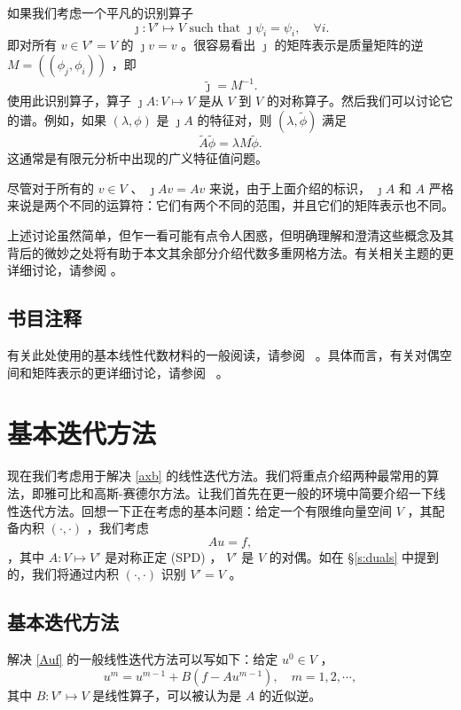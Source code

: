 \documentclass[12pt]{acta_2011xz}
\begin{document}
如果我们考虑一个平凡的识别算子 
   $$
\jmath:  V'\mapsto V \mbox{ such that } \jmath
\psi_i=\psi_i,\quad\forall i.
$$    即对所有    $v\in V'=V$    的    $\jmath v=v$    。很容易看出    $\jmath$    的矩阵表示是质量矩阵的逆
   $M=((\phi_j,\phi_i))$    ，即
   $$
\tilde \jmath=M^{-1}.
$$    使用此识别算子，算子    $\jmath A: V\mapsto
V$    是从    $V$    到    $V$    的对称算子。然后我们可以讨论它的谱。例如，如果    $(\lambda, \phi)$    是    $\jmath A$    的特征对，则    $(\lambda, \tilde\phi)$    满足
   $$
\tilde A\tilde \phi=\lambda M\tilde \phi.
$$    这通常是有限元分析中出现的广义特征值问题。  

尽管对于所有的    $v\in V$    、    $\jmath Av=Av$    来说，由于上面介绍的标识，    $\jmath A$    和    $A$    严格来说是两个不同的运算符：它们有两个不同的范围，并且它们的矩阵表示也不同。  

上述讨论虽然简单，但乍一看可能有点令人困惑，但明确理解和澄清这些概念及其背后的微妙之处将有助于本文其余部分介绍代数多重网格方法。有关相关主题的更详细讨论，请参阅    \cite{XuMSC-Notes}    。  

   \subsection{书目注释  }    有关此处使用的基本线性代数材料的一般阅读，请参阅~    \cite{1974HalmosP-aa,1992XuJ-aa,XuMSC-Notes}    。具体而言，有关对偶空间和矩阵表示的更详细讨论，请参阅~    \cite{1992XuJ-aa,XuMSC-Notes}    。  

   \section{基本迭代方法  }    
   \label{sec:iterate}    现在我们考虑用于解决    \eqref{axb}    的线性迭代方法。我们将重点介绍两种最常用的算法，即雅可比和高斯-赛德尔方法。让我们首先在更一般的环境中简要介绍一下线性迭代方法。回想一下正在考虑的基本问题：给定一个有限维向量空间    $V$    ，其配备内积
   $(\cdot,\cdot)$    ，我们考虑
   \begin{equation}
\label{Auf}
Au=f,   
\end{equation}    ，其中    $ A: V\mapsto V' $    是对称正定 (SPD) ，   $V'$    是    $V$    的对偶。如在    \S       \ref{s:duals}    中提到的，我们将通过内积    $(\cdot, \cdot)$    识别    $V'=V$    。  

   \subsection{基本迭代方法  }    解决    \eqref{Auf}    的一般线性迭代方法可以写如下：给定    $u^0\in V$    ，
   \begin{equation}
\label{eq:iterate}
u^{m}= u^{m-1}+B(f-Au^{m-1}), \quad m=1,2,\cdots ,
\end{equation}    其中    $B: V'\mapsto V$    是线性算子，可以被认为是    $A$    的近似逆。  
\end{document}

